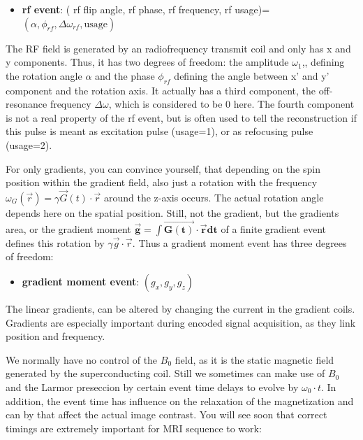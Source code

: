 \documentclass[a4paper,12pt]{extarticle}
\begin{document}
\begin{itemize}
\item \textbf{rf event}: ( rf flip angle, rf phase, rf frequency, rf usage)= $(\alpha, \phi_{rf}, \Delta\omega_{rf}, \text{usage})$
\end{itemize}

The RF field is generated by an radiofrequency transmit coil and only has x and y components. Thus, it has two degrees of freedom: the amplitude $\omega_1$,, defining the rotation angle $\alpha$ and the phase $\phi_{rf}$ defining the angle between x' and y' component and the rotation axis. It actually has a third component, the off-resonance frequency $\Delta\omega$, which is considered to be 0 here. The fourth component is not a real property of the rf event, but is often used to tell the reconstruction if this pulse is meant as excitation pulse (usage=1), or as refocusing pulse (usage=2).
\\
\newline

For only gradients, you can convince yourself, that depending on the spin position within the gradient field, also just a rotation with the frequency $\omega_G(\vec{r}) = \gamma\vec{G}(t)\cdot\vec{r}$ around the z-axis occurs. The actual rotation angle depends here on the spatial position. Still, not the gradient, but the gradients area, or the gradient moment $\mathbf{\vec{g}=\int \vec{G(t)}\cdot\vec{r}dt}$ of a finite gradient event defines this rotation by $\gamma \vec{g}\cdot \vec{r}$. Thus a gradient moment event has three degrees of freedom:

\begin{itemize}
\item \textbf{gradient moment event}:  $(g_x, g_y, g_z)$
\end{itemize}
The linear gradients, can be altered by changing the current in the gradient coils. Gradients are especially important during encoded signal acquisition, as they link position and frequency.

We normally have no control of the $B_0$ field, as it is the static magnetic field generated by the superconducting coil. Still we sometimes can make use of $B_0$ and the Larmor preseccion by certain event time delays to evolve by $\omega_0\cdot t$.  In addition, the event time has influence on the relaxation of the magnetization and can by that affect the actual image contrast. You will see soon that correct timings are extremely important for MRI sequence to work:
\end{document}
